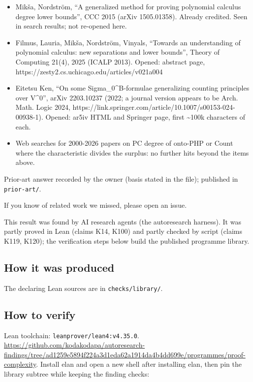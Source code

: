 \documentclass{article}
\begin{document}
\begin{itemize}
\item Mikša, Nordström, ``A generalized method for proving polynomial calculus degree lower bounds'', CCC 2015 (arXiv 1505.01358). Already credited. Seen in search results; not re-opened here.
\item Filmus, Lauria, Mikša, Nordström, Vinyals, ``Towards an understanding of polynomial calculus: new separations and lower bounds'', Theory of Computing 21(4), 2025 (ICALP 2013). Opened: abstract page, https://zesty2.cs.uchicago.edu/articles/v021a004
\item Eitetsu Ken, ``On some Sigma\_0\textasciicircum{}B-formulae generalizing counting principles over V\textasciicircum{}0'', arXiv 2203.10237 (2022; a journal version appears to be Arch. Math. Logic 2024, https://link.springer.com/article/10.1007/s00153-024-00938-1). Opened: ar5iv HTML and Springer page, first \textasciitilde{}100k characters of each.
\item Web searches for 2000-2026 papers on PC degree of onto-PHP or Count where the characteristic divides the surplus: no further hits beyond the items above.
\end{itemize}

Prior-art answer recorded by the owner (basis stated in the file); published in \texttt{prior-art/}.

If you know of related work we missed, please open an issue.

This result was found by AI research agents (the autoresearch harness). It was partly proved in Lean (claims K14, K100) and partly checked by script (claims K119, K120); the verification steps below build the published programme library.

\subsection*{How it was produced}

The declaring Lean sources are in \texttt{checks/library/}.

\subsection*{How to verify}

Lean toolchain: \texttt{leanprover/lean4:v4.35.0}. \url{https://github.com/kodakodapa/autoresearch-findings/tree/ad1259e5894f224a3d1eda62a1914da4b4dd699e/programmes/proof-complexity}. Install elan and open a new shell after installing elan, then pin the library subtree while keeping the finding checks:
\end{document}
